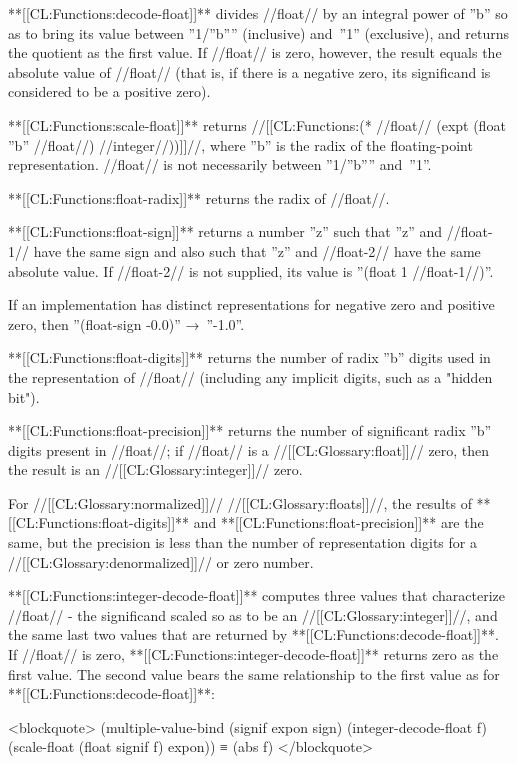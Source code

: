 **[[CL:Functions:decode-float]]** divides //float// by an integral power of ''b'' so as to bring its value between ''1/''b'''' (inclusive) and~''1'' (exclusive), and returns the quotient as the first value. If //float// is zero, however, the result equals the absolute value of //float// (that is, if there is a negative zero, its significand is considered to be a positive zero).

**[[CL:Functions:scale-float]]** returns //[[CL:Functions:(* //float// (expt (float ''b'' //float//) //integer//))\/]]//, where ''b'' is the radix of the floating-point representation. //float// is not necessarily between ''1/''b'''' and~''1''.


**[[CL:Functions:float-radix]]** returns the radix of //float//.

**[[CL:Functions:float-sign]]** returns a number ''z'' such that ''z'' and //float-1// have the same sign and also such that ''z'' and //float-2// have the same absolute value. If //float-2// is not supplied, its value is ''(float 1 //float-1//)''.

If an implementation has distinct representations for negative zero and positive zero, then ''(float-sign -0.0)'' →\ ''-1.0''.

**[[CL:Functions:float-digits]]** returns the number of radix ''b'' digits used in the representation of //float// (including any implicit digits, such as a "hidden bit").

**[[CL:Functions:float-precision]]** returns the number of significant radix ''b'' digits present in //float//; if //float// is a //[[CL:Glossary:float]]// zero, then the result is an //[[CL:Glossary:integer]]// zero.

For //[[CL:Glossary:normalized]]// //[[CL:Glossary:floats]]//, the results of **[[CL:Functions:float-digits]]** and **[[CL:Functions:float-precision]]** are the same, but the precision is less than the number of representation digits for a //[[CL:Glossary:denormalized]]// or zero number.

**[[CL:Functions:integer-decode-float]]** computes three values that characterize //float// - the significand scaled so as to be an //[[CL:Glossary:integer]]//, and the same last two values that are returned by **[[CL:Functions:decode-float]]**. If //float// is zero, **[[CL:Functions:integer-decode-float]]** returns zero as the first value. The second value bears the same relationship to the first value as for **[[CL:Functions:decode-float]]**:

<blockquote> (multiple-value-bind (signif expon sign) (integer-decode-float f) (scale-float (float signif f) expon)) ≡ (abs f) </blockquote>

